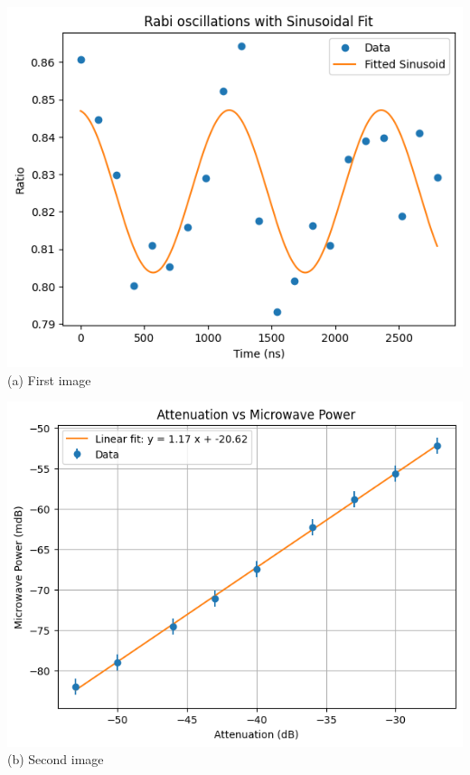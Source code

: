 \documentclass{beamer}
\begin{document}
\begin{frame}{}
    \centering
    \begin{minipage}{0.4\textwidth}
        \centering
        \includegraphics[width=\linewidth]{presentation/figs/oscilations.png} \\
        {\small (a) First image}
    \end{minipage}
    \hfill
    \begin{minipage}{0.4\textwidth}
        \centering
        \includegraphics[width=\linewidth]{presentation/figs/attenuation_vs_power.png} \\
        {\small (b) Second image}
    \end{minipage}


\end{frame}
\end{document}
